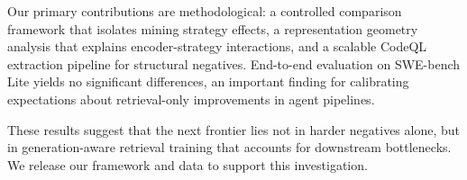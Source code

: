 \documentclass[11pt,a4paper]{article}
\begin{document}
Our primary contributions are methodological: a controlled comparison framework that isolates mining strategy effects, a representation geometry analysis that explains encoder-strategy interactions, and a scalable CodeQL extraction pipeline for structural negatives. End-to-end evaluation on SWE-bench Lite yields no significant differences, an important finding for calibrating expectations about retrieval-only improvements in agent pipelines.

These results suggest that the next frontier lies not in harder negatives alone, but in generation-aware retrieval training that accounts for downstream bottlenecks. We release our framework and data to support this investigation.


\end{document}
